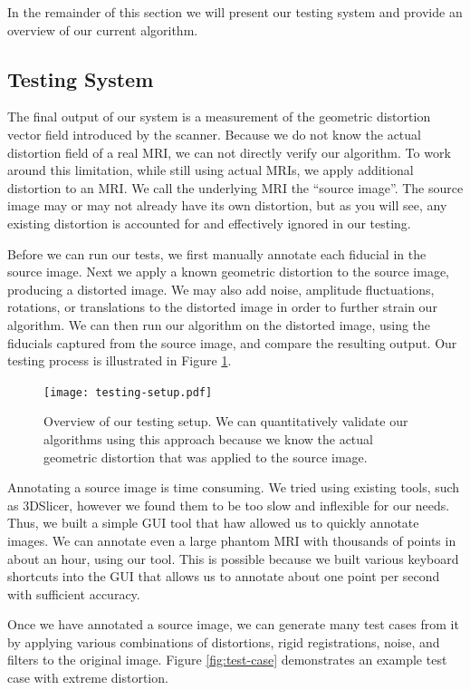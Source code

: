 \documentclass[12pt]{article}
\begin{document}
In the remainder of this section we will present our testing system and provide an overview of our current algorithm.

\subsection*{Testing System}
The final output of our system is a measurement of the geometric distortion vector field introduced by the scanner.  Because we do not know the actual distortion field of a real MRI, we can not directly verify our algorithm.  To work around this limitation, while still using actual MRIs, we apply additional distortion to an MRI.  We call the underlying MRI the ``source image''.  The source image may or may not already have its own distortion, but as you will see, any existing distortion is accounted for and effectively ignored in our testing.

Before we can run our tests, we first manually annotate each fiducial in the source image.  Next we apply a known geometric distortion to the source image, producing a distorted image.  We may also add noise, amplitude fluctuations, rotations, or translations to the distorted image in order to further strain our algorithm.  We can then run our algorithm on the distorted image, using the fiducials captured from the source image, and compare the resulting output.  Our testing process is illustrated in Figure \ref{fig:testing-setup}.

\begin{figure}[h]
    \centering
    \texttt{[image: testing-setup.pdf]}
    \caption{Overview of our testing setup.  We can quantitatively validate our algorithms using this approach because we know the actual geometric distortion that was applied to the source image.}
    \label{fig:testing-setup}
\end{figure}

Annotating a source image is time consuming.  We tried using existing tools, such as 3DSlicer, however we found them to be too slow and inflexible for our needs.  Thus, we built a simple GUI tool that haw allowed us to quickly annotate images.  We can annotate even a large phantom MRI with thousands of points in about an hour, using our tool.  This is possible because we built various keyboard shortcuts into the GUI that allows us to annotate about one point per second with sufficient accuracy.

Once we have annotated a source image, we can generate many test cases from it by applying various combinations of distortions, rigid registrations, noise, and filters to the original image.  Figure \ref{fig:test-case} demonstrates an example test case with extreme distortion.
\end{document}
